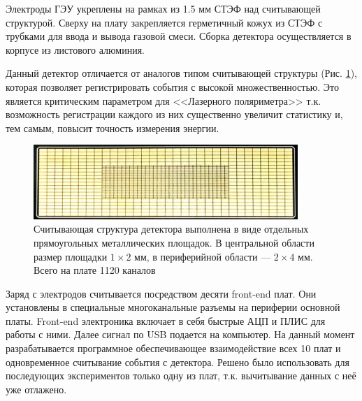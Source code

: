 \par Электроды ГЭУ укреплены на рамках из 1.5 мм СТЭФ над считывающей структурой. Сверху на плату закрепляется герметичный кожух из СТЭФ с трубками для ввода и вывода газовой смеси. Сборка детектора осуществляется в корпусе из листового алюминия.
\par Данный детектор отличается от аналогов типом считывающей структуры (Рис. \ref{fig:readout_structure}), которая позволяет регистрировать события с высокой множественностью. Это является критическим параметром для <<Лазерного поляриметра>> т.к. возможность регистрации каждого из них существенно увеличит статистику и, тем самым, повысит точность измерения энергии.
\begin{figure}[H]
	\begin{center}
		\includegraphics[width = 10cm]{img/Main_board_pads.jpg}
		\caption{Считывающая структура детектора выполнена в виде отдельных прямоугольных металлических площадок. В центральной области размер площадки $1\times2$ мм, в периферийной области --- $2\times4$ мм. Всего на плате 1120 каналов}
		\label{fig:readout_structure}
	\end{center}%
\end{figure}%
\noindent Заряд с электродов считывается  посредством десяти front-end плат. Они установлены в специальные многоканальные разъемы на периферии основной платы. Front-end электроника включает в себя быстрые АЦП и ПЛИС для работы с ними. Далее сигнал по USB подается на компьютер. На данный момент разрабатывается программное обеспечивающее взаимодействие всех 10 плат и одновременное считывание события с детектора. Решено было использовать для последующих экспериментов только одну из плат, т.к. вычитывание данных с неё уже отлажено. 
